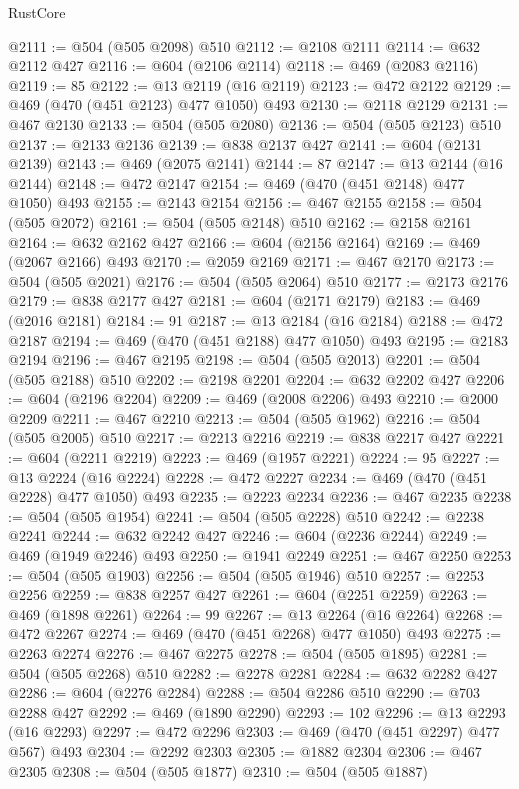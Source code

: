 \begin{lexlean}{RustCore}
\begin{coremodule}
@2111 := @504 (@505 @2098) @510
@2112 := @2108 @2111
@2114 := @632 @2112 @427
@2116 := @604 (@2106 @2114)
@2118 := @469 (@2083 @2116)
@2119 := 85
@2122 := @13 @2119 (@16 @2119)
@2123 := @472 @2122
@2129 := @469 (@470 (@451 @2123) @477 @1050) @493
@2130 := @2118 @2129
@2131 := @467 @2130
@2133 := @504 (@505 @2080)
@2136 := @504 (@505 @2123) @510
@2137 := @2133 @2136
@2139 := @838 @2137 @427
@2141 := @604 (@2131 @2139)
@2143 := @469 (@2075 @2141)
@2144 := 87
@2147 := @13 @2144 (@16 @2144)
@2148 := @472 @2147
@2154 := @469 (@470 (@451 @2148) @477 @1050) @493
@2155 := @2143 @2154
@2156 := @467 @2155
@2158 := @504 (@505 @2072)
@2161 := @504 (@505 @2148) @510
@2162 := @2158 @2161
@2164 := @632 @2162 @427
@2166 := @604 (@2156 @2164)
@2169 := @469 (@2067 @2166) @493
@2170 := @2059 @2169
@2171 := @467 @2170
@2173 := @504 (@505 @2021)
@2176 := @504 (@505 @2064) @510
@2177 := @2173 @2176
@2179 := @838 @2177 @427
@2181 := @604 (@2171 @2179)
@2183 := @469 (@2016 @2181)
@2184 := 91
@2187 := @13 @2184 (@16 @2184)
@2188 := @472 @2187
@2194 := @469 (@470 (@451 @2188) @477 @1050) @493
@2195 := @2183 @2194
@2196 := @467 @2195
@2198 := @504 (@505 @2013)
@2201 := @504 (@505 @2188) @510
@2202 := @2198 @2201
@2204 := @632 @2202 @427
@2206 := @604 (@2196 @2204)
@2209 := @469 (@2008 @2206) @493
@2210 := @2000 @2209
@2211 := @467 @2210
@2213 := @504 (@505 @1962)
@2216 := @504 (@505 @2005) @510
@2217 := @2213 @2216
@2219 := @838 @2217 @427
@2221 := @604 (@2211 @2219)
@2223 := @469 (@1957 @2221)
@2224 := 95
@2227 := @13 @2224 (@16 @2224)
@2228 := @472 @2227
@2234 := @469 (@470 (@451 @2228) @477 @1050) @493
@2235 := @2223 @2234
@2236 := @467 @2235
@2238 := @504 (@505 @1954)
@2241 := @504 (@505 @2228) @510
@2242 := @2238 @2241
@2244 := @632 @2242 @427
@2246 := @604 (@2236 @2244)
@2249 := @469 (@1949 @2246) @493
@2250 := @1941 @2249
@2251 := @467 @2250
@2253 := @504 (@505 @1903)
@2256 := @504 (@505 @1946) @510
@2257 := @2253 @2256
@2259 := @838 @2257 @427
@2261 := @604 (@2251 @2259)
@2263 := @469 (@1898 @2261)
@2264 := 99
@2267 := @13 @2264 (@16 @2264)
@2268 := @472 @2267
@2274 := @469 (@470 (@451 @2268) @477 @1050) @493
@2275 := @2263 @2274
@2276 := @467 @2275
@2278 := @504 (@505 @1895)
@2281 := @504 (@505 @2268) @510
@2282 := @2278 @2281
@2284 := @632 @2282 @427
@2286 := @604 (@2276 @2284)
@2288 := @504 @2286 @510
@2290 := @703 @2288 @427
@2292 := @469 (@1890 @2290)
@2293 := 102
@2296 := @13 @2293 (@16 @2293)
@2297 := @472 @2296
@2303 := @469 (@470 (@451 @2297) @477 @567) @493
@2304 := @2292 @2303
@2305 := @1882 @2304
@2306 := @467 @2305
@2308 := @504 (@505 @1877)
@2310 := @504 (@505 @1887)

\end{coremodule}
\end{lexlean}
